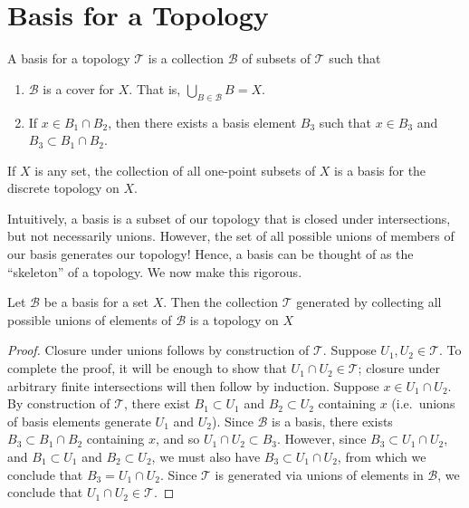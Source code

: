 \section{Basis for a Topology}
\begin{definition}
	\label{def:basis}
	A basis for a topology $\mathcal{T}$ is a collection $\mathcal{B}$ of subsets of
	$\mathcal{T}$ such that
	\begin{enumerate}
		\item $\mathcal{B}$ is a cover for $X$. That is, $\bigcup_{B \in
			\mathcal{B}} B = X$.
		\item If $x \in B_{1} \cap B_{2}$, then there exists a basis element
			$B_{3}$ such that $x \in B_{3}$ and $B_{3} \subset B_{1} \cap
			B_{2}$.
	\end{enumerate}
\end{definition}
\begin{example}
	If $X$ is any set, the collection of all one-point subsets of $X$
	is a basis for the discrete topology on $X$.
\end{example}
Intuitively, a basis is a subset of our topology that is closed under
intersections, but not necessarily unions. However, the set of all possible
unions of members of our basis generates our topology!
Hence, a basis can be thought of as the ``skeleton'' of a topology.
We now make this rigorous.
\begin{theorem}
	\label{thm:basis-gen-topology}
	Let $\mathcal{B}$ be a basis for a set $X$. Then the collection $\mathcal{T}$
	generated by collecting all possible unions of elements of $\mathcal{B}$ is
	a topology on $X$
\end{theorem}
\begin{proof}
	Closure under unions follows by construction of $\mathcal{T}$. Suppose
	$U_{1}, U_{2} \in \mathcal{T}$. To complete the proof, it will be enough to
	show that $U_{1} \cap U_{2} \in \mathcal{T}$; closure under arbitrary finite
	intersections will then follow by induction. Suppose $x \in U_{1} \cap
	U_{2}$. By construction of $\mathcal{T}$, there exist $B_{1} \subset U_{1}$
	and $B_{2} \subset U_{2}$ containing $x$ (i.e.\ unions of basis elements
	generate $U_{1}$ and $U_{2}$). Since $\mathcal{B}$ is a basis, there exists
	$B_{3} \subset B_{1} \cap B_{2}$ containing $x$, and so $U_{1} \cap U_{2}
	\subset B_{3}$. However, since $B_{3} \subset U_{1} \cap U_{2}$, and $B_{1}
	\subset U_{1}$ and $B_{2} \subset U_{2}$, we must also have $B_{3} \subset
	U_{1} \cap U_{2}$, from which we conclude that $B_{3} = U_{1} \cap U_{2}$.
	Since $\mathcal{T}$ is generated via unions of elements in $\mathcal{B}$, we
	conclude that $U_{1} \cap U_{2} \in \mathcal{T}$.
\end{proof}
